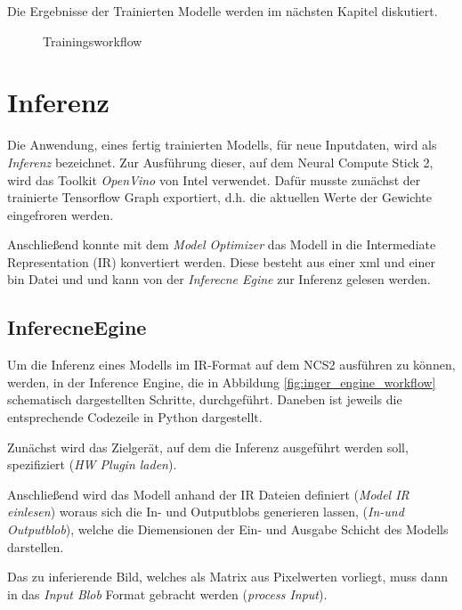 Die Ergebnisse der Trainierten Modelle 
werden im nächsten Kapitel diskutiert.


\vspace{1cm}
\begin{figure}[H]
    \centering
    
    \caption{Trainingsworkflow}
    \label{fig:train_workflow}
\end{figure}
\vspace{1cm}


\section{Inferenz}\label{sec:inferenz}

Die Anwendung, eines fertig trainierten Modells, für 
neue Inputdaten, wird als \textit{Inferenz} bezeichnet.
Zur Ausführung dieser, auf dem Neural Compute Stick 2, 
wird das Toolkit \textit{OpenVino} von Intel verwendet.
Dafür musste zunächst der trainierte Tensorflow Graph 
exportiert, d.h. die aktuellen Werte der Gewichte 
eingefroren werden.

Anschließend konnte mit dem \textit{Model Optimizer}
das Modell in die Intermediate Representation (IR)
konvertiert werden.
Diese besteht aus einer xml und einer bin Datei und 
und kann von der \textit{Inferecne Egine} 
zur Inferenz gelesen werden.


\subsection*{InferecneEgine}

Um die Inferenz eines Modells im IR-Format 
auf dem NCS2 ausführen zu können, werden, 
in der Inference Engine, die in Abbildung 
\ref{fig:inger_engine_workflow} schematisch
dargestellten Schritte, durchgeführt.
Daneben ist jeweils die entsprechende 
Codezeile in Python dargestellt.

Zunächst wird das Zielgerät, auf dem 
die Inferenz ausgeführt werden soll,
spezifiziert (\textit{HW Plugin laden}).

Anschließend wird das Modell anhand der 
IR Dateien definiert (\textit{Model IR einlesen})
woraus sich die In- und Outputblobs generieren 
lassen, (\textit{In-und Outputblob}), 
welche die Diemensionen der Ein- und Ausgabe 
Schicht des Modells darstellen.

Das zu inferierende Bild,
welches als Matrix aus Pixelwerten 
vorliegt, muss dann in das \textit{Input Blob}
Format gebracht werden (\textit{process Input}).

